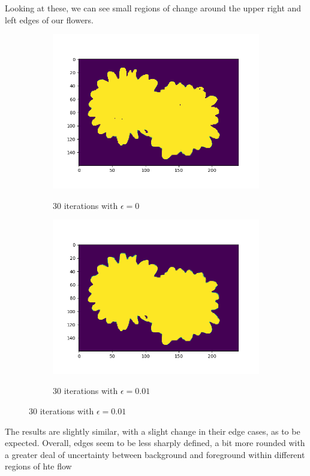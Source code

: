 \documentclass[12pt]{article}
\begin{document}
\begin{section}{4.6}
Looking at these, we can see small regions of change around the upper right and left edges of our flowers. 
\\
\begin{figure}[H]
	\centering
	\begin{subfigure}{.5\textwidth}
		\centering
		\includegraphics[width=.8\linewidth]{30iterepi0_00.png}
		\label{0epiresult30}
		\caption{30 iterations with $\epsilon = 0$}
	\end{subfigure}%
	\begin{subfigure}{.5\textwidth}
		\centering
		\includegraphics[width=.8\linewidth]{30iterepi0_01.png}
		\label{0epiresul1}
		\caption{30 iterations with $\epsilon = 0.01$}
	\end{subfigure}
	\label{fig:test2}
\end{figure}
The results are slightly similar, with a slight change in their edge cases, as to be expected. Overall, edges seem to be less sharply defined, a bit more rounded with a greater deal of uncertainty between background and foreground within different regions of hte flow


\end{section}
\end{document}
